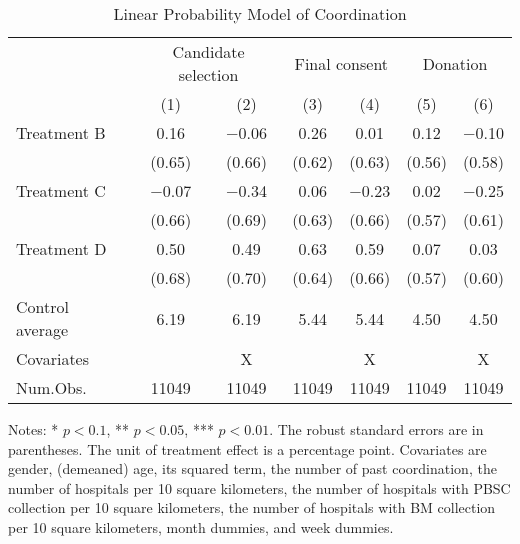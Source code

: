 \documentclass[12pt, a4paper]{article}
\begin{document}
\begin{table}[H]

\caption{\label{tab:coordinate-reg}Linear Probability Model of Coordination}
\centering
\fontsize{9}{11}\selectfont
\begin{threeparttable}
\begin{tabular}[t]{lcccccc}
\toprule
\multicolumn{1}{c}{ } & \multicolumn{2}{c}{Candidate selection} & \multicolumn{2}{c}{Final consent} & \multicolumn{2}{c}{Donation} \\
\cmidrule(l{3pt}r{3pt}){2-3} \cmidrule(l{3pt}r{3pt}){4-5} \cmidrule(l{3pt}r{3pt}){6-7}
  & (1) & (2) & (3) & (4) & (5) & (6)\\
\midrule
Treatment B & \num{0.16} & \num{-0.06} & \num{0.26} & \num{0.01} & \num{0.12} & \num{-0.10}\\
 & (\num{0.65}) & (\num{0.66}) & (\num{0.62}) & (\num{0.63}) & (\num{0.56}) & (\num{0.58})\\
Treatment C & \num{-0.07} & \num{-0.34} & \num{0.06} & \num{-0.23} & \num{0.02} & \num{-0.25}\\
 & (\num{0.66}) & (\num{0.69}) & (\num{0.63}) & (\num{0.66}) & (\num{0.57}) & (\num{0.61})\\
Treatment D & \num{0.50} & \num{0.49} & \num{0.63} & \num{0.59} & \num{0.07} & \num{0.03}\\
 & (\num{0.68}) & (\num{0.70}) & (\num{0.64}) & (\num{0.66}) & (\num{0.57}) & (\num{0.60})\\
\midrule
Control average & 6.19 & 6.19 & 5.44 & 5.44 & 4.50 & 4.50\\
Covariates &  & X &  & X &  & X\\
Num.Obs. & \num{11049} & \num{11049} & \num{11049} & \num{11049} & \num{11049} & \num{11049}\\
\bottomrule
\end{tabular}
\begin{tablenotes}
\item Notes: * $p < 0.1$, ** $p < 0.05$, *** $p < 0.01$. The robust standard errors are in parentheses. The unit of treatment effect is a percentage point. Covariates are gender, (demeaned) age, its squared term, the number of past coordination, the number of hospitals per 10 square kilometers, the number of hospitals with PBSC collection per 10 square kilometers, the number of hospitals with BM collection per 10 square kilometers, month dummies, and week dummies.
\end{tablenotes}
\end{threeparttable}
\end{table}
\end{document}
